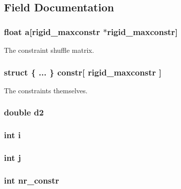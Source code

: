 \subsection{Field Documentation}
\hypertarget{structrigid_a99527087b873825e5207af1d1094b544}{
\subsubsection[{a}]{\setlength{\rightskip}{0pt plus 5cm}float a\mbox{[}{\bf rigid\-\_\-maxconstr} $\ast${\bf rigid\-\_\-maxconstr}\mbox{]}}}\label{structrigid_a99527087b873825e5207af1d1094b544}
The constraint shuffle matrix. \hypertarget{structrigid_a310c461f319ef4420a817e52fc9823d0}{
\subsubsection[{constr}]{\setlength{\rightskip}{0pt plus 5cm}struct \{ ... \}   constr\mbox{[} {\bf rigid\-\_\-maxconstr} \mbox{]}}}\label{structrigid_a310c461f319ef4420a817e52fc9823d0}
The constraints themselves. \hypertarget{structrigid_a13b4e96542fec65c7a11bc18f5a5439e}{
\subsubsection[{d2}]{\setlength{\rightskip}{0pt plus 5cm}double d2}}\label{structrigid_a13b4e96542fec65c7a11bc18f5a5439e}
\hypertarget{structrigid_acb559820d9ca11295b4500f179ef6392}{
\subsubsection[{i}]{\setlength{\rightskip}{0pt plus 5cm}int i}}\label{structrigid_acb559820d9ca11295b4500f179ef6392}
\hypertarget{structrigid_a37d972ae0b47b9099e30983131d31916}{
\subsubsection[{j}]{\setlength{\rightskip}{0pt plus 5cm}int j}}\label{structrigid_a37d972ae0b47b9099e30983131d31916}
\hypertarget{structrigid_a3016fd6c2bac51bd377ee1f3c1d1928b}{
\subsubsection[{nr\-\_\-constr}]{\setlength{\rightskip}{0pt plus 5cm}int nr\-\_\-constr}}\label{structrigid_a3016fd6c2bac51bd377ee1f3c1d1928b}
